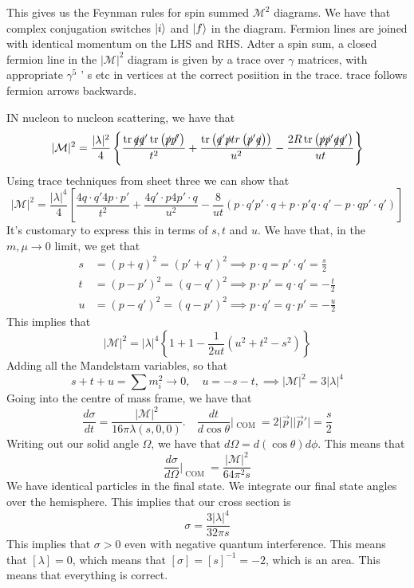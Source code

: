 This gives us the Feynman rules 
for spin summed $ \mathcal{ M } ^ 2 $ diagrams. 
We have that complex conjugation switches $ \ket{ i } $ and 
$ \ket{ f } $ in the diagram. 
Fermion lines are joined with identical momentum on the LHS and RHS. 
Adter a spin sum, a closed fermion line in the $| \mathcal{ M } | ^ 2 $ diagram 
is given by a trace over $ \gamma $ matrices, with appropriate $\gamma ^ 5 $ ' s
etc in vertices at the correct posiition in the trace. trace follows 
fermion arrows backwards. 

IN nucleon to nucleon scattering, 
we have that 
\[
 | \mathcal{ M } | ^ 2 = \frac{| \lambda | ^ 2 }{ 4 } \left\{  
 \frac{\tr \slashed{q}\slashed{q}' \tr \left( \slashed{p} \slashed{p'} \right) }{t ^ 2 } + 
 \frac{ \tr \left( \slashed{q}' \slashed{p} tr\left( \slashed{p}' \slashed{q}  \right)  \right) }{u^ 2 }
  - \frac{2 R  \tr \left( \slashed{p} \slashed{p}' \slashed{q} \slashed{q}' \right) }{ ut }\right\} 
\] 
Using trace techniques from sheet three we can show that 
\[
 | \mathcal{ M } | ^ 2 = \frac{ | \lambda | ^ 4 }{4 } \left[ 
 \frac{ 4 q \cdot  q ' 4 p \cdot  p ' }{ t ^ 2 } + \frac{ 4 q ' \cdot  p 4 p ' \cdot  q }{ u ^ 2 }
   - \frac{8}{ut } ( p \cdot  q ' p ' \cdot  q + p \cdot  p ' q \cdot  q ' - p \cdot  q p' \cdot  q ' )\right] 
\] It's customary to 
express this in terms of $ s, t $ and $ u$. 
We have that, in the  $ m , \mu \to 0 $  limit, 
we get that 
\begin{align*}
	s & = ( p + q ) ^ 2  = ( p' + q ' ) ^ 2 \implies p \cdot  q  = p ' \cdot  q'  = \frac{s}{2 } \\
	t &=  ( p - p' ) ^ 2  = ( q - q ' ) ^ 2 \implies p \cdot  p ' = q \cdot  q ' =  - \frac{t}{2 }  \\
	u &=  ( p - q ' ) ^ 2  = ( q - p ' ) ^ 2 \implies p \cdot  q '  = q \cdot  p ' = - \frac{u}{2 }  
\end{align*}
This implies that 
\[
	| \mathcal{ M } | ^ 2  = | \lambda | ^ 4 \left\{  1 + 1  - \frac{1}{2 ut } \left( u ^ 2 + t ^ 2 - s ^ 2 \right)  \right\} 
\] Adding all the Mandelstam variables, so that 
\[
 s + t + u  = \sum m _ i ^ 2  \to 0 , \quad u = - s - t, \implies | \mathcal{ M } | ^ 2  = 3 | \lambda | ^  4
\] Going into the centre of mass frame, 
we have that 
\[
	\frac{ d \sigma  }{ dt } = \frac{ | \mathcal{ M } | ^ 2 }{ 16 \pi \lambda ( s, 0 , 0 ) }. \quad 
	\frac{dt }{ d \cos \theta } | _{ \text{ COM } }  = 2  |\vec{p} | | \vec{p} ' |  = \frac{ s}{2}
\] Writing out our solid angle $ \Omega$, we have that 
$ d \Omega= d \left( \cos \theta  \right)  d \phi $. 
This means that 
\[
 \frac{ d \sigma }{ d \Omega } |_{ \text{ COM } }  = \frac{ | \mathcal{ M } | ^ 2 }{ 64 \pi ^ 2 s }
\] We have identical particles in the final state. 
We integrate our final state angles over the hemisphere. 
This implies that our cross section is 
\[
 \sigma = \frac{ 3 | \lambda | ^ 4 }{ 32 \pi s }
\] This implies that $ \sigma > 0 $ even with negative quantum 
interference. This means that $ [ \lambda ] =0 $, which means 
that $ [ \sigma ]  = [ s ] ^{ - 1} = - 2$, which is an area. 
This means that everything is correct.

